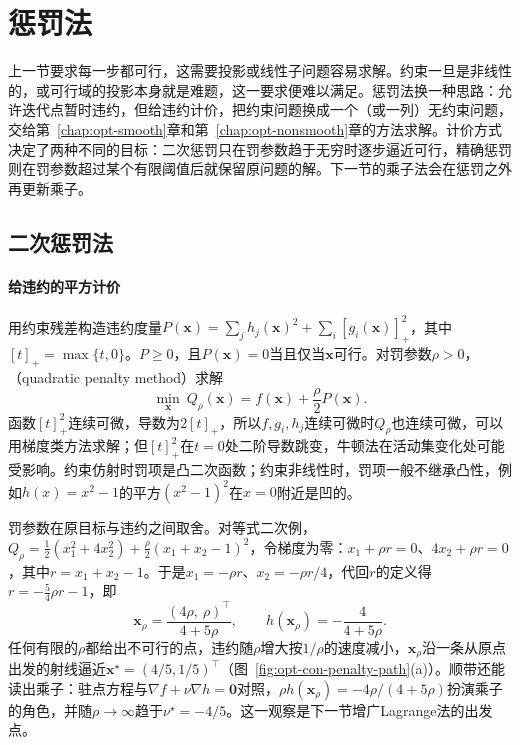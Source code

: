\section{惩罚法}
\label{sec:opt-con-penalty}

上一节要求每一步都可行，这需要投影或线性子问题容易求解。约束一旦是非线性的，或可行域的投影本身就是难题，这一要求便难以满足。惩罚法换一种思路：允许迭代点暂时违约，但给违约计价，把约束问题换成一个（或一列）无约束问题，交给第~\ref{chap:opt-smooth}章和第~\ref{chap:opt-nonsmooth}章的方法求解。计价方式决定了两种不同的目标：二次惩罚只在罚参数趋于无穷时逐步逼近可行，精确惩罚则在罚参数超过某个有限阈值后就保留原问题的解。下一节的乘子法会在惩罚之外再更新乘子。

\subsection{二次惩罚法}
\label{sec:opt-con-quadratic-penalty}

\paragraph{给违约的平方计价}
用约束残差构造违约度量$P(\bm x)=\sum_jh_j(\bm x)^2+\sum_i[g_i(\bm x)]_+^2$，其中$[t]_+=\max\{t,0\}$。$P\geq0$，且$P(\bm x)=0$当且仅当$\bm x$可行。对罚参数$\rho>0$，（quadratic penalty method）求解
\begin{equation}
\label{eq:opt-con-quadratic-penalty}
  \min_{\bm x}\ Q_\rho(\bm x)=f(\bm x)+\frac\rho2P(\bm x).
\end{equation}
函数$[t]_+^2$连续可微，导数为$2[t]_+$，所以$f,g_i,h_j$连续可微时$Q_\rho$也连续可微，可以用梯度类方法求解；但$[t]_+^2$在$t=0$处二阶导数跳变，牛顿法在活动集变化处可能受影响。约束仿射时罚项是凸二次函数；约束非线性时，罚项一般不继承凸性，例如$h(x)=x^2-1$的平方$(x^2-1)^2$在$x=0$附近是凹的。

罚参数在原目标与违约之间取舍。对等式二次例，$Q_\rho=\frac12(x_1^2+4x_2^2)+\frac\rho2(x_1+x_2-1)^2$，令梯度为零：$x_1+\rho r=0$、$4x_2+\rho r=0$，其中$r=x_1+x_2-1$。于是$x_1=-\rho r$、$x_2=-\rho r/4$，代回$r$的定义得$r=-\frac54\rho r-1$，即
\[
  \bm x_\rho=\frac{(4\rho,\ \rho)^\top}{4+5\rho},\qquad
  h(\bm x_\rho)=-\frac{4}{4+5\rho}.
\]
任何有限的$\rho$都给出不可行的点，违约随$\rho$增大按$1/\rho$的速度减小，$\bm x_\rho$沿一条从原点出发的射线逼近$\bm x^\star=(4/5,1/5)^\top$（图~\ref{fig:opt-con-penalty-path}(a)）。顺带还能读出乘子：驻点方程与$\nabla f+\nu\nabla h=\bm0$对照，$\rho h(\bm x_\rho)=-4\rho/(4+5\rho)$扮演乘子的角色，并随$\rho\to\infty$趋于$\nu^\star=-4/5$。这一观察是下一节增广Lagrange法的出发点。

